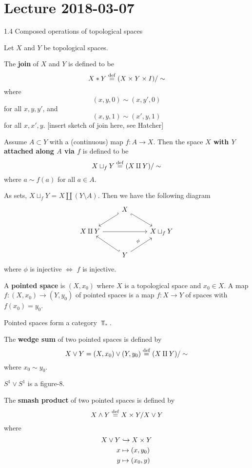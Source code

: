 \section{Lecture 2018-03-07}

1.4 Composed operations of topological spaces

Let $X$ and $Y$ be topological spaces.

\begin{defn}
	The \textbf{join} of $X$ and $Y$ is defined to be
	\[X*Y \overset{\mathrm{def}}{=} (X \times Y \times I)/\sim\]
	where
	\[(x,y,0) \sim (x,y',0)\]
	for all $x,y,y'$, and
	\[(x,y,1) \sim (x',y,1)\]
	for all $x,x',y$.
	[insert sketch of join here, see Hatcher]
\end{defn}

\begin{defn}
	Assume $A \subset Y$ with a (continuous) map $f:A \to X$.
	Then the space \textbf{$X$ with $Y$ attached along $A$ via $f$} is defined to be
	\[X \sqcup_f Y \overset{\mathrm{def}}{=} (X \amalg Y)/\sim\]
	where $a \sim f(a)$ for all $a \in A$.
	
	As sets, $X \sqcup_f Y$ = $X \amalg (Y \setminus A)$.
	Then we have the following diagram
	\[
	\begin{tikzcd}
		& X \arrow[rd, hook'] \arrow[ld, hook'] &  \\
		X \amalg Y \arrow[rr] &  & X \sqcup_f Y \\
		& Y \arrow[ru, "\phi"] \arrow[lu, hook'] & 
	\end{tikzcd}
	\]
	where $\phi$ is injective $\iff$ $f$ is injective.
\end{defn}

\begin{defn}
	A \textbf{pointed space} is $(X,x_0)$ where $X$ is a topological space and $x_0 \in X$.
	A map $f:(X,x_0) \to (Y,y_0)$ of pointed spaces is a map $f:X \to Y$ of spaces with $f(x_0)=y_0$.
	
	Pointed spaces form a category $\Top_*$.
\end{defn}

\begin{defn}
	The \textbf{wedge sum} of two pointed spaces is defined by
	\[X \vee Y = (X,x_0) \vee (Y,y_0) \overset{\mathrm{def}}{=} (X \amalg Y)/\sim\]
	where $x_0 \sim y_0$.
\end{defn}

\begin{exam}
	$S^1 \vee S^1$ is a figure-8.
\end{exam}

\begin{defn}
	The \textbf{smash product} of two pointed spaces is defined by
	\[X \wedge Y \overset{\mathrm{def}}{=} X \times Y / X \vee Y\]
	where
	\begin{align*}
		X \vee Y &\hookrightarrow X \times Y \\
		x &\mapsto (x,y_0) \\
		y &\mapsto (x_0,y)
	\end{align*}
\end{defn}

